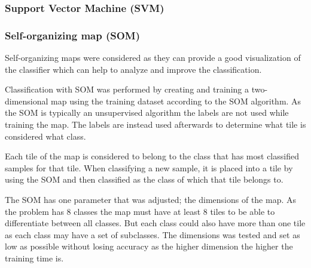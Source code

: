 \documentclass[doc/report.tex]{subfiles}
\begin{document}
\subsubsection{Support Vector Machine (SVM)}

\subsubsection{Self-organizing map (SOM)}
Self-organizing maps were considered as they can provide a good visualization
of the classifier which can help to analyze and improve the classification.

Classification with SOM was performed by creating and training a
two-dimensional map using the training dataset according to the SOM algorithm.
As the SOM is typically an unsupervised algorithm the labels are not used while
training the map. The labels are instead used afterwards to determine what tile
is considered what class.

Each tile of the map is considered to belong to the class that has most
classified samples for that tile. When classifying a new sample, it is placed
into a tile by using the SOM and then classified as the class of which that
tile belongs to.

The SOM has one parameter that was adjusted; the dimensions of the map. As the
problem has 8 classes the map must have at least 8 tiles to be able to
differentiate between all classes. But each class could also have more than one
tile as each class may have a set of subclasses. The dimensions was tested and
set as low as possible without losing accuracy as the higher dimension the
higher the training time is.
    
\end{document}
